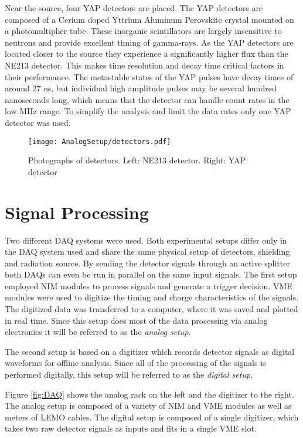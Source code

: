 \documentclass[main.tex]{subfiles}
\begin{document}
Near the source, four YAP detectors are placed. The YAP detectors are composed of a Cerium doped Yttrium Aluminum Perovskite crystal mounted on a photomultiplier tube. These inorganic scintillators are largely insensitive to neutrons and provide excellent timing of gamma-rays. As the YAP detectors are located closer to the source they experience a significantly higher flux than the NE213 detector. This makes time resolution and decay time critical factors in their performance. The metastable states of the YAP pulses have decay times of around 27 ns, but individual high amplitude pulses may be several hundred nanoseconds long, which means that the detector can handle count rates in the low MHz range. To simplify the analysis and limit the data rates only one YAP detector was used.

\begin{figure}[h]
    \centering
        \texttt{[image: AnalogSetup/detectors.pdf]}
        \caption[Photographs of detectors]{Photographs of detectors. Left: NE213 detector. Right: YAP detector}
    \label{fig:detectors}
\end{figure}


\section{Signal Processing}
Two different DAQ systems were used. Both experimental setups differ only in the DAQ system used and share the same physical setup of detectors, shielding and radiation source. By sending the detector signals through an active splitter both DAQs can even be run in parallel on the same input signals. The first setup employed NIM modules to process signals and generate a trigger decision. VME modules were used to digitize the timing and charge characteristics of the signals. The digitized data was transferred to a computer, where it was saved and plotted in real time. Since this setup does most of the data processing via analog electronics it will be referred to as the \textit{analog setup}. 

The second setup is based on a digitizer which records detector signals as digital waveforms for offline analysis. Since all of the processing of the signals is performed digitally, this setup will be referred to as the \textit{digital setup}. 

Figure \ref{fig:DAQ} shows the analog rack on the left and the digitizer to the right. The analog setup is composed of a variety of NIM and VME modules as well as meters of LEMO cables. The digital setup is composed of a single digitizer, which takes two raw detector signals as inputs and fits in a single VME slot.
\end{document}
